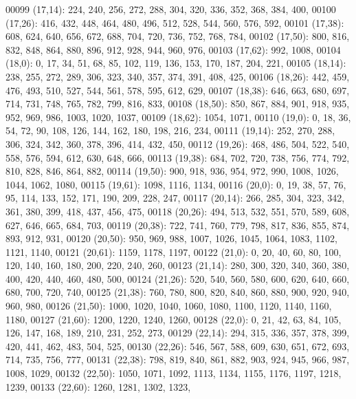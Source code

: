 \begin{DoxyCode}
00099       (17,14): 224, 240, 256, 272, 288, 304, 320, 336, 352, 368, 384, 400,
00100       (17,26): 416, 432, 448, 464, 480, 496, 512, 528, 544, 560, 576, 592,
00101       (17,38): 608, 624, 640, 656, 672, 688, 704, 720, 736, 752, 768, 784,
00102       (17,50): 800, 816, 832, 848, 864, 880, 896, 912, 928, 944, 960, 976,
00103       (17,62): 992, 1008,
00104       (18,0): 0, 17, 34, 51, 68, 85, 102, 119, 136, 153, 170, 187, 204, 221,
00105       (18,14): 238, 255, 272, 289, 306, 323, 340, 357, 374, 391, 408, 425,
00106       (18,26): 442, 459, 476, 493, 510, 527, 544, 561, 578, 595, 612, 629,
00107       (18,38): 646, 663, 680, 697, 714, 731, 748, 765, 782, 799, 816, 833,
00108       (18,50): 850, 867, 884, 901, 918, 935, 952, 969, 986, 1003, 1020, 1037,
00109       (18,62): 1054, 1071,
00110       (19,0): 0, 18, 36, 54, 72, 90, 108, 126, 144, 162, 180, 198, 216, 234,
00111       (19,14): 252, 270, 288, 306, 324, 342, 360, 378, 396, 414, 432, 450,
00112       (19,26): 468, 486, 504, 522, 540, 558, 576, 594, 612, 630, 648, 666,
00113       (19,38): 684, 702, 720, 738, 756, 774, 792, 810, 828, 846, 864, 882,
00114       (19,50): 900, 918, 936, 954, 972, 990, 1008, 1026, 1044, 1062, 1080,
00115       (19,61): 1098, 1116, 1134,
00116       (20,0): 0, 19, 38, 57, 76, 95, 114, 133, 152, 171, 190, 209, 228, 247,
00117       (20,14): 266, 285, 304, 323, 342, 361, 380, 399, 418, 437, 456, 475,
00118       (20,26): 494, 513, 532, 551, 570, 589, 608, 627, 646, 665, 684, 703,
00119       (20,38): 722, 741, 760, 779, 798, 817, 836, 855, 874, 893, 912, 931,
00120       (20,50): 950, 969, 988, 1007, 1026, 1045, 1064, 1083, 1102, 1121, 1140,
00121       (20,61): 1159, 1178, 1197,
00122       (21,0): 0, 20, 40, 60, 80, 100, 120, 140, 160, 180, 200, 220, 240, 260,
00123       (21,14): 280, 300, 320, 340, 360, 380, 400, 420, 440, 460, 480, 500,
00124       (21,26): 520, 540, 560, 580, 600, 620, 640, 660, 680, 700, 720, 740,
00125       (21,38): 760, 780, 800, 820, 840, 860, 880, 900, 920, 940, 960, 980,
00126       (21,50): 1000, 1020, 1040, 1060, 1080, 1100, 1120, 1140, 1160, 1180,
00127       (21,60): 1200, 1220, 1240, 1260,
00128       (22,0): 0, 21, 42, 63, 84, 105, 126, 147, 168, 189, 210, 231, 252, 273,
00129       (22,14): 294, 315, 336, 357, 378, 399, 420, 441, 462, 483, 504, 525,
00130       (22,26): 546, 567, 588, 609, 630, 651, 672, 693, 714, 735, 756, 777,
00131       (22,38): 798, 819, 840, 861, 882, 903, 924, 945, 966, 987, 1008, 1029,
00132       (22,50): 1050, 1071, 1092, 1113, 1134, 1155, 1176, 1197, 1218, 1239,
00133       (22,60): 1260, 1281, 1302, 1323,

\end{DoxyCode}
